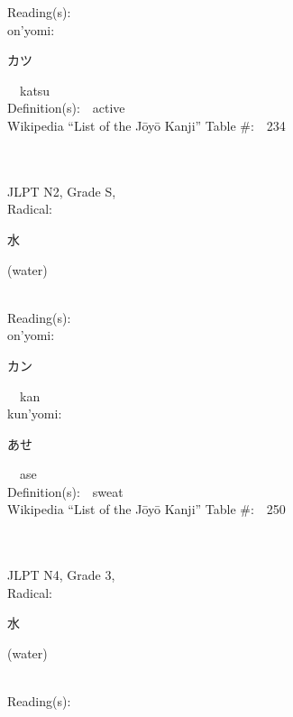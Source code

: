 \begin{multicols}{2}
Reading(s):\ \ \\
{\hspace*{1em}}on'yomi:\ \ \\
{\hspace*{2em}}{\begin{CJK}{UTF8}{min} カツ \end{CJK}}\ \ katsu\ \ \\
Definition(s):\ \ active \\
Wikipedia ``List of the J\=oy\=o Kanji'' Table \#:\ \ 234 \\
\ \ \\
{\fontsize{34pt}{40pt}  }\ \ \\  %
{JLPT N2, Grade S, \\Radical:\ \ {\begin{CJK}{UTF8}{min} 水 \end{CJK}} (water) } \\
Reading(s):\ \ \\
{\hspace*{1em}}on'yomi:\ \ \\
{\hspace*{2em}}{\begin{CJK}{UTF8}{min} カン \end{CJK}}\ \ kan\ \ \\
{\hspace*{1em}}kun'yomi:\ \ \\
{\hspace*{2em}}{\begin{CJK}{UTF8}{min} あせ \end{CJK}}\ \ ase\ \ \\
Definition(s):\ \ sweat \\
Wikipedia ``List of the J\=oy\=o Kanji'' Table \#:\ \ 250 \\
\ \ \\
{\fontsize{34pt}{40pt}  }\ \ \\  %
{JLPT N4, Grade 3, \\Radical:\ \ {\begin{CJK}{UTF8}{min} 水 \end{CJK}} (water) } \\
Reading(s):\ \ \\

\end{multicols}
